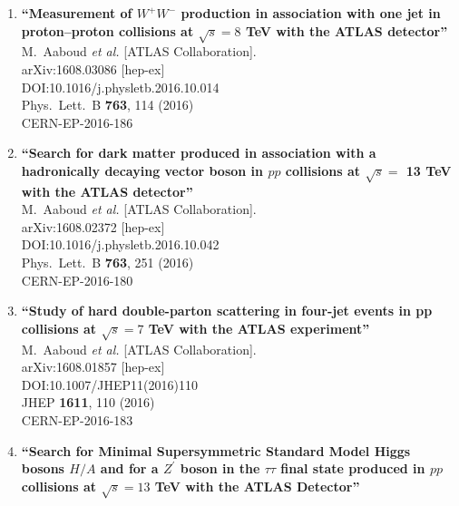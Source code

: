\documentclass{article}
\begin{document}
\begin{enumerate}
\item%
{\bf ``Measurement of $W^+W^-$ production in association with one jet in proton--proton collisions at $\sqrt{s} =8$ TeV with the ATLAS detector''}
  \\{}M.~Aaboud {\it et al.} [ATLAS Collaboration].
  \\{}arXiv:1608.03086 [hep-ex]
  \\{}DOI:10.1016/j.physletb.2016.10.014
  \\{}Phys.\ Lett.\ B {\bf 763}, 114 (2016)
  \\{}CERN-EP-2016-186
\item%
{\bf ``Search for dark matter produced in association with a hadronically decaying vector boson in $pp$ collisions at $\sqrt{s} =$ 13 TeV with the ATLAS detector''}
  \\{}M.~Aaboud {\it et al.} [ATLAS Collaboration].
  \\{}arXiv:1608.02372 [hep-ex]
  \\{}DOI:10.1016/j.physletb.2016.10.042
  \\{}Phys.\ Lett.\ B {\bf 763}, 251 (2016)
  \\{}CERN-EP-2016-180
\item%
{\bf ``Study of hard double-parton scattering in four-jet events in pp collisions at $ \sqrt{s}=7 $ TeV with the ATLAS experiment''}
  \\{}M.~Aaboud {\it et al.} [ATLAS Collaboration].
  \\{}arXiv:1608.01857 [hep-ex]
  \\{}DOI:10.1007/JHEP11(2016)110
  \\{}JHEP {\bf 1611}, 110 (2016)
  \\{}CERN-EP-2016-183
\item%
{\bf ``Search for Minimal Supersymmetric Standard Model Higgs bosons $H/A$ and for a $Z^{\prime}$ boson in the $\tau \tau$ final state produced in $pp$ collisions at $\sqrt{s}=13$ TeV with the ATLAS Detector''}

\end{enumerate}
\end{document}
